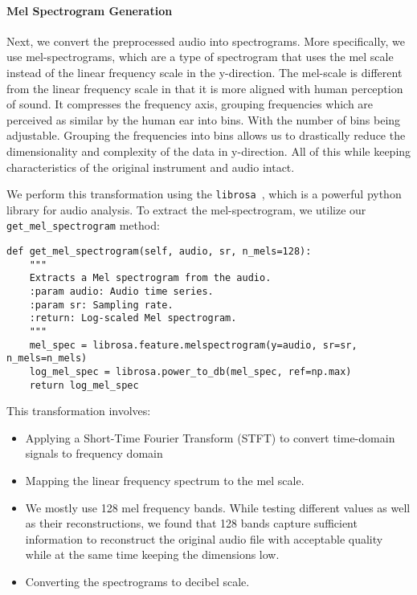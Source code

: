 \paragraph{Mel Spectrogram Generation}
Next, we convert the preprocessed audio into spectrograms.
More specifically, we use mel-spectrograms, which are a type of spectrogram that uses the mel scale instead of the linear frequency scale in the y-direction.
The mel-scale is different from the linear frequency scale in that it is more aligned with human perception of sound. It compresses the frequency axis, grouping frequencies which are perceived as similar by the human ear into bins.
With the number of bins being adjustable. Grouping the frequencies into bins allows us to drastically reduce the dimensionality and complexity of the data in y-direction.
All of this while keeping characteristics of the original instrument and audio intact.

We perform this transformation using the \texttt{librosa}~\cite{librosa}, which is a powerful python library for audio analysis.
To extract the mel-spectrogram, we utilize our \texttt{get\_mel\_spectrogram} method:

\begin{lstlisting}[caption=Mel spectrogram extraction]
def get_mel_spectrogram(self, audio, sr, n_mels=128):
    """
    Extracts a Mel spectrogram from the audio.
    :param audio: Audio time series.
    :param sr: Sampling rate.
    :return: Log-scaled Mel spectrogram.
    """
    mel_spec = librosa.feature.melspectrogram(y=audio, sr=sr, n_mels=n_mels)
    log_mel_spec = librosa.power_to_db(mel_spec, ref=np.max)
    return log_mel_spec
\end{lstlisting}

This transformation involves:
\begin{itemize}
    \item Applying a Short-Time Fourier Transform (STFT) to convert time-domain signals to frequency domain
    \item Mapping the linear frequency spectrum to the mel scale.
    \item We mostly use 128 mel frequency bands. While testing different values as well as their reconstructions, we found that 128 bands capture sufficient information to reconstruct the original audio file with acceptable quality while at the same time keeping the dimensions low.
    \item Converting the spectrograms to decibel scale.
\end{itemize}


